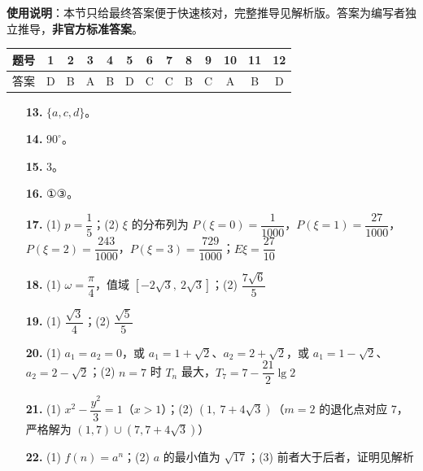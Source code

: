 
\begin{gknotice}
\textbf{使用说明}：本节只给最终答案便于快速核对，完整推导见解析版。答案为编写者独立推导，\textbf{非官方标准答案}。
\end{gknotice}

\begin{center}\begin{tabular}{ccccccccccccc}
\toprule
题号 & 1 & 2 & 3 & 4 & 5 & 6 & 7 & 8 & 9 & 10 & 11 & 12 \\
\midrule
答案 & D & B & A & B & D & C & C & B & C & A & B & D \\
\bottomrule
\end{tabular}\end{center}

\begin{itemize}[leftmargin=2.6em]
  \item[\textbf{13.}] $\{a,c,d\}$。
  \item[\textbf{14.}] $90^\circ$。
  \item[\textbf{15.}] $3$。
  \item[\textbf{16.}] ①③。
\end{itemize}

\begin{itemize}[leftmargin=2.6em]
  \item[\textbf{17.}] (1) $p=\dfrac15$；(2) $\xi$ 的分布列为 $P(\xi=0)=\dfrac1{1000}$，$P(\xi=1)=\dfrac{27}{1000}$，$P(\xi=2)=\dfrac{243}{1000}$，$P(\xi=3)=\dfrac{729}{1000}$；$E\xi=\dfrac{27}{10}$
  \item[\textbf{18.}] (1) $\omega=\dfrac\pi4$，值域 $\left[-2\sqrt3,\ 2\sqrt3\right]$；(2) $\dfrac{7\sqrt6}{5}$
  \item[\textbf{19.}] (1) $\dfrac{\sqrt3}4$；(2) $\dfrac{\sqrt5}5$
  \item[\textbf{20.}] (1) $a_1=a_2=0$，或 $a_1=1+\sqrt2$、$a_2=2+\sqrt2$，或 $a_1=1-\sqrt2$、$a_2=2-\sqrt2$；(2) $n=7$ 时 $T_n$ 最大，$T_7=7-\dfrac{21}2\lg2$
  \item[\textbf{21.}] (1) $x^2-\dfrac{y^2}3=1$（$x>1$）；(2) $\left(1,\ 7+4\sqrt3\right)$（$m=2$ 的退化点对应 $7$，严格解为 $(1,7)\cup(7,7+4\sqrt3)$）
  \item[\textbf{22.}] (1) $f(n)=a^n$；(2) $a$ 的最小值为 $\sqrt{17}$；(3) 前者大于后者，证明见解析
\end{itemize}

